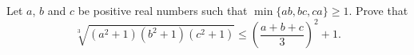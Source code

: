 Let $a$, $b$ and $c$ be positive real numbers such that $\min\{ab, bc, ca\} \geq 1$. Prove that
\[
\sqrt[3]{(a^2 + 1)(b^2 + 1)(c^2 + 1)} \leq \left( \frac{a+b+c}{3} \right)^2 + 1.
\]
